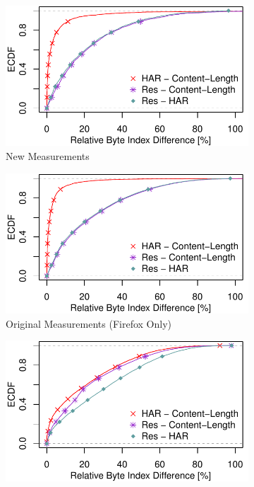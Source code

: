 \begin{figure}
 \centering
 \begin{subfigure}{\linewidth}
		\includegraphics[width=\linewidth]{New_Plots/ecdf_rel_object_byte_index.pdf}
	\caption{New Measurements}
	\label{fig:new_relative_byte_index}
\end{subfigure}\par\medskip
 \begin{subfigure}{\linewidth}
		\includegraphics[width=\linewidth]{Firefox Plots/ecdf_rel_object_byte_index.pdf}
	\caption{Original Measurements (Firefox Only)}
	\label{fig:orig_firefox_relative_byte_index}
\end{subfigure}\par\medskip
 \begin{subfigure}{\linewidth}
		\includegraphics[width=\linewidth]{Chrome_Plots/ecdf_rel_object_byte_index.pdf}

\end{subfigure}
\end{figure}
